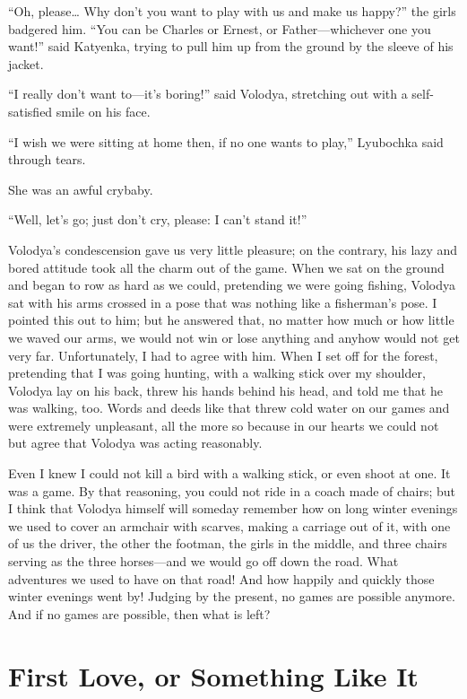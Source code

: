 ``Oh, please\ldots{} Why don't you want to play with us and make us happy?'' the girls badgered him. ``You can be Charles or Ernest, or Father---whichever one you want!'' said Katyenka, trying to pull him up from the ground by the sleeve of his jacket. %

``I really don't want to---it's boring!'' said Volodya, stretching out with a self-satisfied smile on his face.

``I wish we were sitting at home then, if no one wants to play,'' Lyubochka said through tears. %

She was an awful crybaby.

``Well, let's go; just don't cry, please: I can't stand it!'' %

Volodya's condescension gave us very little pleasure; on the contrary, his lazy and bored attitude took all the charm out of the game. When we sat on the ground and began to row as hard as we could, pretending we were going fishing, Volodya sat with his arms crossed in a pose that was nothing like a fisherman's pose. I pointed this out to him; but he answered that, no matter how much or how little we waved our arms, we would not win or lose anything and anyhow would not get very far. Unfortunately, I had to agree with him. When I set off for the forest, pretending that I was going hunting, with a walking stick over my shoulder, Volodya lay on his back, threw his hands behind his head, and told me that he was walking, too. Words and deeds like that threw cold water on our games and were extremely unpleasant, all the more so because in our hearts we could not but agree that Volodya was acting reasonably.

Even I knew I could not kill a bird with a walking stick, or even shoot at one. It was a game. By that reasoning, you could not ride in a coach made of chairs; but I think that Volodya himself will someday remember how on long winter evenings we used to cover an armchair with scarves, making a carriage out of it, with one of us the driver, the other the footman, the girls in the middle, and three chairs serving as the three horses---and we would go off down the road. What adventures we used to have on that road! And how happily and quickly those winter evenings went by! Judging by the present, no games are possible anymore. And if no games are possible, then what is left?

\chapter{First Love, or Something Like It} %

